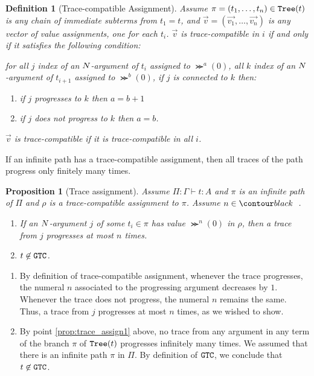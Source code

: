 \documentclass{article}
\newtheorem{proposition}[theorem]{Proposition}
\newtheorem{definition}[theorem]{Definition}
\newenvironment{proof}[1][Proof]{\begin{trivlist}
\item[\hskip \labelsep {\bfseries #1}]}{\end{trivlist}}
\begin{document}
\begin{definition}[Trace-compatible Assignment]
Assume $\pi = (t_1, \ldots, t_n) \in {\tt Tree}(t)$ is any chain of immediate subterms from $t_1=t$,
and $\vec{v} = (\vec{v_1}, \ldots, \vec{v_n})$ 
 is any vector of value assignments, one for each $t_i$. 
$\vec{v}$ is \emph{trace-compatible} in $i$  if and only if it satisfies the following condition:

  for all $j$  index of an ${N}$-argument of $t_i$ assigned to $\Succ^{a}(0)$, 
  all $k$ index of an ${N}$-argument of $t_{i+1}$ assigned to $\Succ^{b}(0)$, 
  if $j$ is connected to $k$ then:
 \begin{enumerate}
 \item
 if $j$ progresses to $k$ then $a=b+1$
 \item
 if $j$ does not progress to $k$ then $a=b$.
 \end{enumerate}
$\vec{v}$ is \emph{trace-compatible} if it is trace-compatible in all $i$.
\end{definition}

If an infinite path has a trace-compatible assignment, then all traces of the path progress only finitely many times.

\begin{proposition}[Trace assignment]
\label{prop:trace_assign}
Assume $\Pi:\Gamma \vdash t:A$ and $\pi$ is an infinite path of $\Pi$ and
$\rho$ is a trace-compatible assignment to $\pi$. Assume $n \in \Nat$.
\begin{enumerate}
\item
\label{prop:trace_assign1}
If an ${N}$-argument $j$ of some $t_i \in \pi$ has value $\Succ^n(0)$ in $\rho$, then a trace
from $j$ progresses at most $n$ times.
\item
\label{prop:trace_assign2}
$t \not \in {\tt GTC}$.
\end{enumerate}
\end{proposition}

\begin{proof}
\begin{enumerate}
\item
By definition of trace-compatible assignment, whenever the trace progresses, 
the numeral $n$ associated to the progressing argument decreases by $1$.
Whenever the trace does not progress, the numeral $n$ remains the same.
Thus, a trace from $j$ progresses at most $n$ times, as we wished to show.
\item
By point \ref{prop:trace_assign1} above, 
no trace from any argument in any term of the branch $\pi$ of ${\tt Tree}(t)$ progresses infinitely many times.
We assumed that there is an infinite path $\pi$ in $\Pi$.
By definition of ${\tt GTC}$, we conclude that $t \not \in {\tt GTC}$. 
\end{enumerate}
\end{proof}
\end{document}
